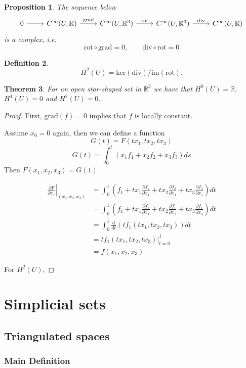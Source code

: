 \documentclass[11pt]{report}
\newtheorem{thm}{Theorem}[chapter]
\newtheorem{prop}[thm]{Proposition}
\theoremstyle{definition}
\newtheorem{defn}[thm]{Definition}
\theoremstyle{remark}
\newcommand{\reals}{\mathbb{R}}
\newcommand{\gradient}{\mathrm{grad}}
\newcommand{\rotation}{\mathrm{rot}}
\newcommand{\divergence}{\mathrm{div}}
\newcommand{\kernel}{\mathrm{ker}}
\newcommand{\image}{\mathrm{im}}
\newcommand{\derive}{\mathrm{d}}
\begin{document}
\begin{prop}
The sequence below
  \[
  \begin{tikzcd}
        0\ar[r]&C^\infty(U,\reals)\ar[r,"\gradient"]& C^\infty(U,\reals^3)\ar[r,"\rotation"]&C^\infty(U,\reals^3)\ar[r,
        "\divergence"]&C^\infty(U,\reals)
  \end{tikzcd}
  \]
  is a complex, i.e.
  \[
  \rotation\circ\gradient=0,\qquad \divergence\circ\rotation=0
  \]
\end{prop}
\begin{defn}
  \[
  H^2(U)=\kernel(\divergence)/\image(\rotation).
  \]
\end{defn}
\begin{thm}
  For an open star-shaped set in $\reals^3$ we have that $H^0(U)=\reals$, $H^1(U)=0$ and $H^2(U)=0$.
\end{thm}
\begin{proof}
  First, $\gradient(f)=0$ implies that $f$ is locally constant.
  
  Assume $x_0=0$ again, then
  we can define a function 
  \[
  G(t)=F(tx_1,tx_2,tx_3)
  \]
  \[
  G(t)=\int_0^t \left(x_1f_1+x_2f_2+x_3f_3\right) ds
  \]
  Then $F(x_1,x_2,x_3)=G(1)$
  
\begin{align*}
\left.\frac{\partial F}{\partial x_1}\right\vert_{(x_1,x_2,x_3)}&=\int_0^1 \left(f_1+tx_1\frac{\partial f_1}{\partial x_1}+tx_2\frac{\partial f_2}{\partial x_1}+tx_3\frac{\partial f_3}{\partial x_1}\right) dt\\
&=\int_0^1 \left(f_1+tx_1\frac{\partial f_1}{\partial x_1}+tx_2\frac{\partial f_1}{\partial x_2}+tx_3\frac{\partial f_1}{\partial x_3}\right) dt\\
&=\int_0^1 \frac{\derive}{\derive t} \left(tf_1(tx_1,tx_2,tx_3)\right) dt\\
&=\left.tf_1(tx_1,tx_2,tx_3)\right\vert_{t=0}^1\\
&=f(x_1,x_2,x_3)
\end{align*}

For $H^2(U)$,
\end{proof}
\chapter{Simplicial sets}
\section{Triangulated spaces}
\subsection{Main Definition}
\end{document}
